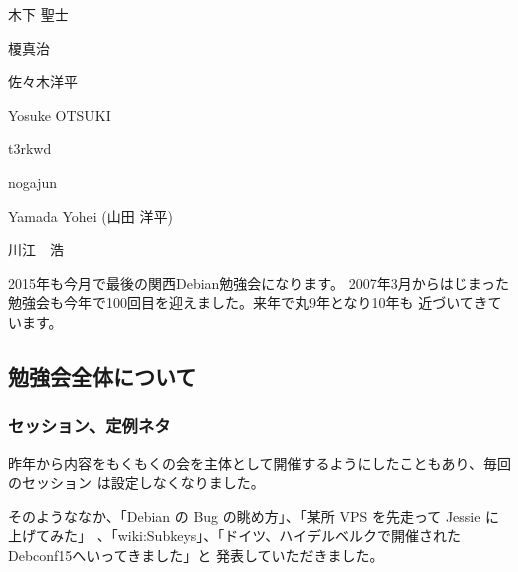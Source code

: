 \documentclass[mingoth,a4paper]{jsarticle}
\begin{document}
\begin{prework}{ 木下 聖士 }
\end{prework}

\begin{prework}{ 榎真治 }
\end{prework}

\begin{prework}{ 佐々木洋平 }
\end{prework}

\begin{prework}{ Yosuke OTSUKI }
\end{prework}

\begin{prework}{ t3rkwd }
\end{prework}

\begin{prework}{ nogajun }
\end{prework}

\begin{prework}{ Yamada Yohei (山田 洋平) }
\end{prework}

\begin{prework}{ 川江　浩 }
\end{prework}




2015年も今月で最後の関西Debian勉強会になります。
2007年3月からはじまった勉強会も今年で100回目を迎えました。来年で丸9年となり10年も
近づいてきています。

\subsection{勉強会全体について}

\subsubsection{セッション、定例ネタ}

昨年から内容をもくもくの会を主体として開催するようにしたこともあり、毎回のセッション
は設定しなくなりました。

そのようななか、「Debian の Bug の眺め方」、「某所 VPS を先走って Jessie に上げてみた」
、「wiki:Subkeys」、「ドイツ、ハイデルベルクで開催されたDebconf15へいってきました」と
発表していただきました。
\end{document}
